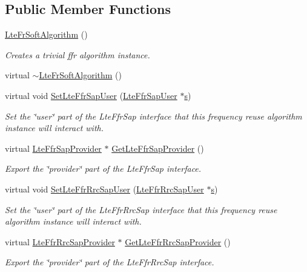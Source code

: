 \subsection*{Public Member Functions}
\begin{DoxyCompactItemize}
\item 
\hyperlink{classns3_1_1LteFrSoftAlgorithm_a9c20a6b77c68784dec889ccf01e21bb6}{Lte\+Fr\+Soft\+Algorithm} ()
\begin{DoxyCompactList}\small\item\em Creates a trivial ffr algorithm instance. \end{DoxyCompactList}\item 
virtual \hyperlink{classns3_1_1LteFrSoftAlgorithm_a0a1298c1dd03c48beeed8ef12b801a57}{$\sim$\+Lte\+Fr\+Soft\+Algorithm} ()
\item 
virtual void \hyperlink{classns3_1_1LteFrSoftAlgorithm_a8018f6414778f2739aac393dde1e839b}{Set\+Lte\+Ffr\+Sap\+User} (\hyperlink{classns3_1_1LteFfrSapUser}{Lte\+Ffr\+Sap\+User} $\ast$\hyperlink{generate__test__data__lte__sinr_8m_ad83eeb3a142285d1243a08c6b7026df8}{s})
\begin{DoxyCompactList}\small\item\em Set the \char`\"{}user\char`\"{} part of the Lte\+Ffr\+Sap interface that this frequency reuse algorithm instance will interact with. \end{DoxyCompactList}\item 
virtual \hyperlink{classns3_1_1LteFfrSapProvider}{Lte\+Ffr\+Sap\+Provider} $\ast$ \hyperlink{classns3_1_1LteFrSoftAlgorithm_a993f37bd784b91ab36bd18b58e500e52}{Get\+Lte\+Ffr\+Sap\+Provider} ()
\begin{DoxyCompactList}\small\item\em Export the \char`\"{}provider\char`\"{} part of the Lte\+Ffr\+Sap interface. \end{DoxyCompactList}\item 
virtual void \hyperlink{classns3_1_1LteFrSoftAlgorithm_a9fd5d73f88f259807a1601cfd6e82442}{Set\+Lte\+Ffr\+Rrc\+Sap\+User} (\hyperlink{classns3_1_1LteFfrRrcSapUser}{Lte\+Ffr\+Rrc\+Sap\+User} $\ast$\hyperlink{generate__test__data__lte__sinr_8m_ad83eeb3a142285d1243a08c6b7026df8}{s})
\begin{DoxyCompactList}\small\item\em Set the \char`\"{}user\char`\"{} part of the Lte\+Ffr\+Rrc\+Sap interface that this frequency reuse algorithm instance will interact with. \end{DoxyCompactList}\item 
virtual \hyperlink{classns3_1_1LteFfrRrcSapProvider}{Lte\+Ffr\+Rrc\+Sap\+Provider} $\ast$ \hyperlink{classns3_1_1LteFrSoftAlgorithm_aeabed2be5ac9324d9e246bd4ceb49f6f}{Get\+Lte\+Ffr\+Rrc\+Sap\+Provider} ()
\begin{DoxyCompactList}\small\item\em Export the \char`\"{}provider\char`\"{} part of the Lte\+Ffr\+Rrc\+Sap interface. \end{DoxyCompactList}\end{DoxyCompactItemize}
